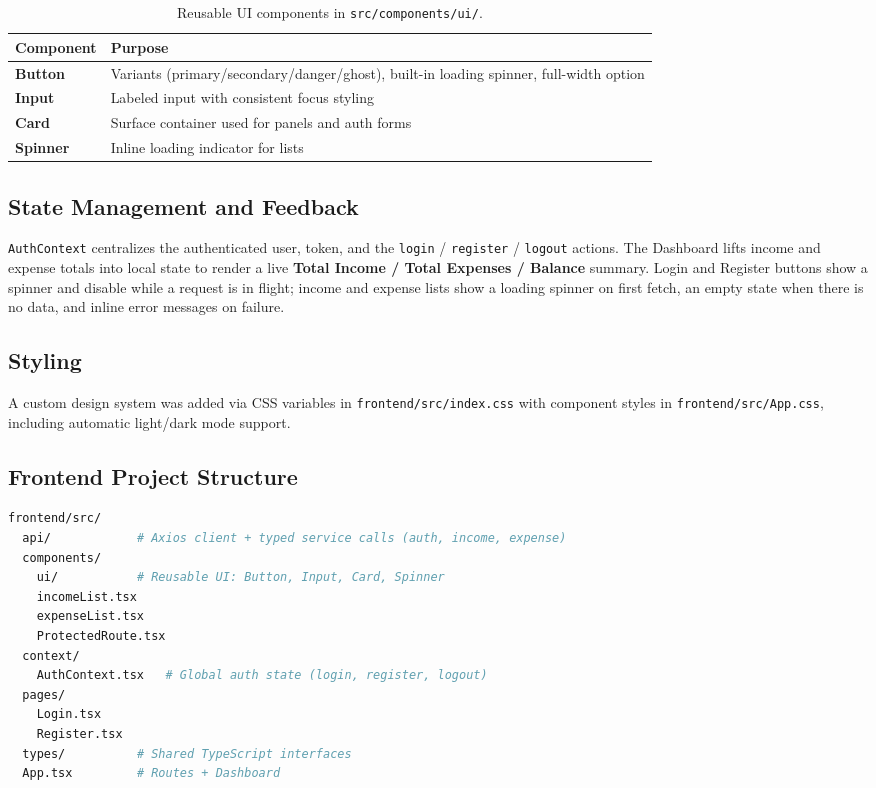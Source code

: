\documentclass[11pt,a4paper]{report}
\begin{document}
\begin{table}[H]
\centering
\begin{tabularx}{\linewidth}{>{\ttfamily\bfseries}l X}
\toprule
\normalfont\bfseries Component & Purpose \\
\midrule
Button  & Variants (primary/secondary/danger/ghost), built-in loading spinner, full-width option \\
Input   & Labeled input with consistent focus styling \\
Card    & Surface container used for panels and auth forms \\
Spinner & Inline loading indicator for lists \\
\bottomrule
\end{tabularx}
\caption{Reusable UI components in \texttt{src/components/ui/}.}
\end{table}

\subsection{State Management and Feedback}
\texttt{AuthContext} centralizes the authenticated user, token, and the
\texttt{login} / \texttt{register} / \texttt{logout} actions. The Dashboard lifts
income and expense totals into local state to render a live
\textbf{Total Income / Total Expenses / Balance} summary. Login and Register
buttons show a spinner and disable while a request is in flight; income and
expense lists show a loading spinner on first fetch, an empty state when there is
no data, and inline error messages on failure.

\subsection{Styling}
A custom design system was added via CSS variables in
\texttt{frontend/src/index.css} with component styles in
\texttt{frontend/src/App.css}, including automatic light/dark mode support.

\subsection{Frontend Project Structure}
\begin{lstlisting}[language=bash,caption={Frontend source layout.}]
frontend/src/
  api/            # Axios client + typed service calls (auth, income, expense)
  components/
    ui/           # Reusable UI: Button, Input, Card, Spinner
    incomeList.tsx
    expenseList.tsx
    ProtectedRoute.tsx
  context/
    AuthContext.tsx   # Global auth state (login, register, logout)
  pages/
    Login.tsx
    Register.tsx
  types/          # Shared TypeScript interfaces
  App.tsx         # Routes + Dashboard
\end{lstlisting}
\end{document}

